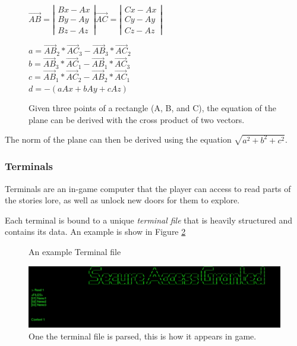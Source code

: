 \documentclass{article}
\begin{document}
\begin{figure}[H]
\centering
\noindent
$
\vec{AB} = \left| \begin{array}{c}
Bx - Ax \\
By - Ay \\
Bz - Az
\end{array} \right|
\vec{AC} = \left| \begin{array}{c}
Cx - Ax \\
Cy - Ay \\
Cz - Az
\end{array} \right|$ 
\vspace{.5cm}

$a = \vec{AB}_2 * \vec{AC}_3 - \vec{AB}_3 * \vec{AC}_2$ \\
$b = \vec{AB}_3 * \vec{AC}_1 - \vec{AB}_1 * \vec{AC}_3$ \\
$c = \vec{AB}_1 * \vec{AC}_2 - \vec{AB}_2 * \vec{AC}_1$ \\
$d = -(aAx + bAy + cAz)$

\caption{Given three points of a rectangle (A, B, and C), the equation of the plane can be derived with the cross product of two vectors. \cite{bib:Plane} }
\label{fig:rectangles}
\end{figure}
The norm of the plane can then be derived using the equation $\sqrt{a^2 + b^2 + c^2}$.

\subsubsection{Terminals} \label{subsubsec:terminals}

Terminals are an in-game computer that the player can access to read parts of the stories lore, as well as unlock new doors for them to explore.

Each terminal is bound to a unique \emph{terminal file} that is heavily structured and contains its data. An example is show in Figure \ref{fig:terminal}

\begin{figure}[H]
	\centering
	
	\caption{An example Terminal file}
	\label{fig:terminal}
\end{figure}

\begin{figure}[H]
	\centering
	\includegraphics[width=500px]{screen}
	\caption{One the terminal file is parsed, this is how it appears in game.}
	\label{fig:terminalscreen}
\end{figure}
\end{document}
